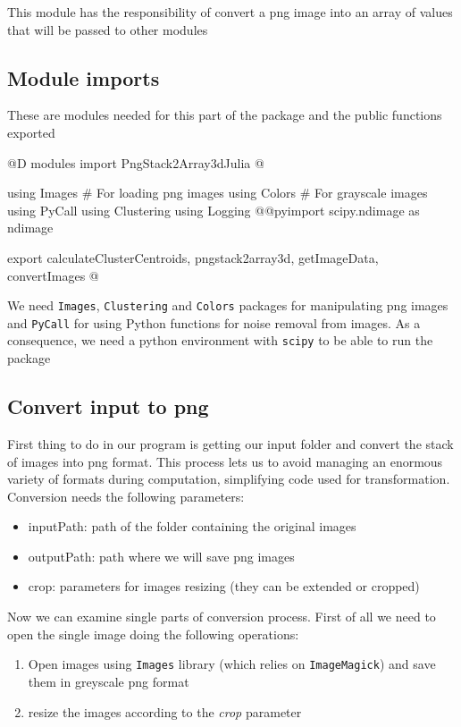 \documentclass[11pt,oneside]{article}	%
\begin{document}
This module has the responsibility of convert a png image into an array of values
that will be passed to other modules

\subsection{Module imports}\label{sec:imports}
These are modules needed for this part of the package and the public functions exported

@D modules import PngStack2Array3dJulia
@{using Images # For loading png images
using Colors # For grayscale images
using PyCall
using Clustering
using Logging
@@pyimport scipy.ndimage as ndimage

export calculateClusterCentroids, pngstack2array3d, getImageData, convertImages
@}

We need \texttt{Images}, \texttt{Clustering} and \texttt{Colors} packages for manipulating png images and \texttt{PyCall} for using Python functions for noise removal from images.
As a consequence, we need a python environment with \texttt{scipy} to be able to run the package

\subsection{Convert input to png}\label{sec:convertPNG}

First thing to do in our program is getting our input folder and convert the stack of images into png format. This process lets us to avoid managing an enormous variety of formats during computation, simplifying code used for transformation.\\

Conversion needs the following parameters:
\begin{itemize}
 \item inputPath: path of the folder containing the original images
 \item outputPath: path where we will save png images
 \item crop: parameters for images resizing (they can be extended or cropped)
\end{itemize}

Now we can examine single parts of conversion process. First of all we need to open the single image doing the following operations:
\begin{enumerate}
 \item Open images using \texttt{Images} library (which relies on \texttt{ImageMagick}) and save them in greyscale png format 
 \item resize the images according to the \textit{crop} parameter
\end{enumerate}
\end{document}
